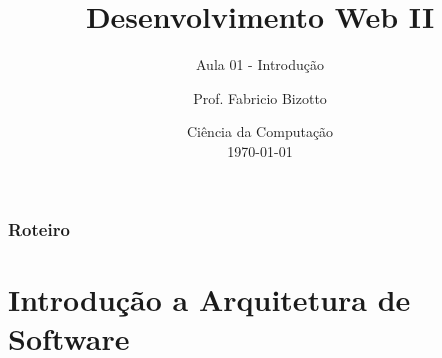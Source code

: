 \documentclass[
	10pt, %
	t, %
]{beamer}
\title[DesWebII]{Desenvolvimento Web II} %
\subtitle{Aula 01 - Introdução} %
\author[Fabricio Bizotto]{Prof. Fabricio Bizotto} %
\institute[IFC]{Instituto Federal Catarinense \\ \smallskip \textit{fabricio.bizotto@ifc.edu.br}} %
\date[\today]{Ciência da Computação \\ \today} %
\begin{document}

\begin{frame}
	\titlepage %
\end{frame}


\begin{frame}
	\frametitle{Roteiro} %
	
	\tableofcontents %
\end{frame}


\section{Introdução a Arquitetura de Software} %
\end{document}
